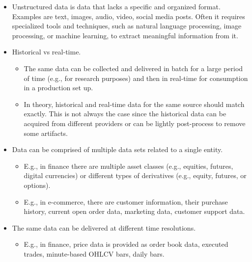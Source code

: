 \documentclass[11pt, reqno]{amsart}
\theoremstyle{definition}
\theoremstyle{remark}
\begin{document}
\begin{itemize}
\begin{itemize}
        \item Unstructured data is data that lacks a specific and organized format.
          Examples are text, images, audio, video, social media posts. Often it requires
          specialized tools and techniques, such as natural language processing,
          image processing, or machine learning, to extract meaningful information
          from it.

        \item Historical vs real-time.
          \begin{itemize}
            \item The same data can be collected and delivered in batch for a large
              period of time (e.g., for research purposes) and then in real-time
              for consumption in a production set up.

            \item In theory, historical and real-time data for the same source
              should match exactly. This is not always the case since the historical
              data can be acquired from different providers or can be lightly post-process
              to remove some artifacts.
          \end{itemize}

        \item Data can be comprised of multiple data sets related to a single entity.
          \begin{itemize}
            \item E.g., in finance there are multiple asset classes (e.g.,
              equities, futures, digital currencies) or different types of derivatives
              (e.g., equity, futures, or options).

            \item E.g., in e-commerce, there are customer information, their purchase
              history, current open order data, marketing data, customer support
              data.
          \end{itemize}

        \item The same data can be delivered at different time resolutions.
          \begin{itemize}
            \item E.g., in finance, price data is provided as order book data, executed
              trades, minute-based OHLCV bars, daily bars.
          \end{itemize}


\end{itemize}
\end{itemize}
\end{document}
